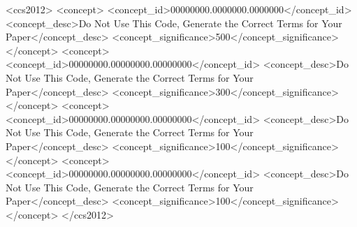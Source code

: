 \documentclass[acmsmall]{acmart}
\begin{document}
\begin{abstract}
Causal reasoning is fundamental to human understanding and information organization. People prefer causal explanations because they offer coherence, predictability, and a sense of control.  Conversational structures shape how knowledge and perspectives are shared, validated, and amplified in networked publics. Understanding the structural effects of causal language can reveal pathways to fostering deeper, more meaningful interactions online. In this work, we investigate how causal language influences the topology and temporal evolution of discussion threads in online conversations with a dataset of 17 million posts across 200 subreddits in 2023 on Reddit. Our results show that causal language is consistently associated with deeper, more sustained conversations, with effects emerging early in the lifecycle of a thread, as demonstrated through a counterfactual experiment. Importantly, emotional responses do not differ substantially between causal language and non-causal language, suggesting that structural depth arises from framing itself rather than affective escalation. A lightweight qualitative analysis shows that causal framing titles prompt users to elaborate more with reasoning and contribute personal experiences, supporting deeper multi-turn exchanges. These findings suggest that causal language acts not merely as a stylistic device, but as a cognitively grounded and structurally influential signal that shapes the topological structures of online conversations. 
\end{abstract}

\begin{CCSXML}
<ccs2012>
 <concept>
  <concept_id>00000000.0000000.0000000</concept_id>
  <concept_desc>Do Not Use This Code, Generate the Correct Terms for Your Paper</concept_desc>
  <concept_significance>500</concept_significance>
 </concept>
 <concept>
  <concept_id>00000000.00000000.00000000</concept_id>
  <concept_desc>Do Not Use This Code, Generate the Correct Terms for Your Paper</concept_desc>
  <concept_significance>300</concept_significance>
 </concept>
 <concept>
  <concept_id>00000000.00000000.00000000</concept_id>
  <concept_desc>Do Not Use This Code, Generate the Correct Terms for Your Paper</concept_desc>
  <concept_significance>100</concept_significance>
 </concept>
 <concept>
  <concept_id>00000000.00000000.00000000</concept_id>
  <concept_desc>Do Not Use This Code, Generate the Correct Terms for Your Paper</concept_desc>
  <concept_significance>100</concept_significance>
 </concept>
</ccs2012>
\end{CCSXML}
\end{document}
